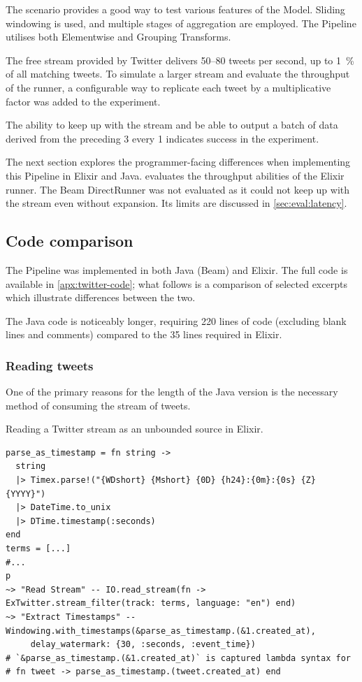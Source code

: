 The scenario provides a good way to test various features of the Model.
Sliding windowing is used, and multiple stages of aggregation are employed.
The Pipeline utilises both Elementwise and Grouping Transforms.

The free stream provided by Twitter delivers \num{50}--\num{80} tweets per second, up to \SI{1}{\percent} of all matching tweets.
To simulate a larger stream and evaluate the throughput of the runner, a configurable way to replicate each tweet by a multiplicative factor was added to the experiment.

The ability to keep up with the stream and be able to output a batch of data derived from the preceding \SI{3}{\min} every \SI{1}{\min} indicates success in the experiment.

The next section explores the programmer-facing differences when implementing this Pipeline in Elixir and Java.
 evaluates the throughput abilities of the Elixir runner.
The Beam DirectRunner was not evaluated as it could not keep up with the stream even without expansion.
Its limits are discussed in \cref{sec:eval:latency}.

\subsection{Code comparison}\label{sec:eval:twitter:code}

The Pipeline was implemented in both Java (Beam) and Elixir.
The full code is available in \cref{apx:twitter-code}; what follows is a comparison of selected excerpts which illustrate differences between the two.

The Java code is noticeably longer, requiring 220 lines of code (excluding blank lines and comments) compared to the 35 lines required in Elixir.

\subsubsection{Reading tweets}

One of the primary reasons for the length of the Java version is the necessary method of consuming the stream of tweets.

\begin{codelisting}
	\caption{Reading a Twitter stream as an unbounded source in Elixir.}
	\label{lst:eval:twitter-readstream-elixir}
	\begin{verbatim}
parse_as_timestamp = fn string ->
  string
  |> Timex.parse!("{WDshort} {Mshort} {0D} {h24}:{0m}:{0s} {Z} {YYYY}")
  |> DateTime.to_unix
  |> DTime.timestamp(:seconds)
end
terms = [...]
#...
p
~> "Read Stream" -- IO.read_stream(fn -> ExTwitter.stream_filter(track: terms, language: "en") end)
~> "Extract Timestamps" -- Windowing.with_timestamps(&parse_as_timestamp.(&1.created_at),
     delay_watermark: {30, :seconds, :event_time})
# `&parse_as_timestamp.(&1.created_at)` is captured lambda syntax for
# fn tweet -> parse_as_timestamp.(tweet.created_at) end
	\end{verbatim}
\end{codelisting}


